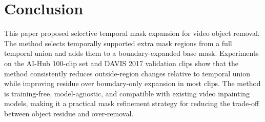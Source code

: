 \documentclass[nouppercase]{kaia}
\begin{document}
\section{Conclusion}
This paper proposed selective temporal mask expansion for video object removal. The method selects temporally supported extra mask regions from a full temporal union and adds them to a boundary-expanded base mask. Experiments on the AI-Hub 100-clip set and DAVIS 2017 validation clips show that the method consistently reduces outside-region changes relative to temporal union while improving residue over boundary-only expansion in most clips. The method is training-free, model-agnostic, and compatible with existing video inpainting models, making it a practical mask refinement strategy for reducing the trade-off between object residue and over-removal.



\newpage
\newpage
\end{document}
